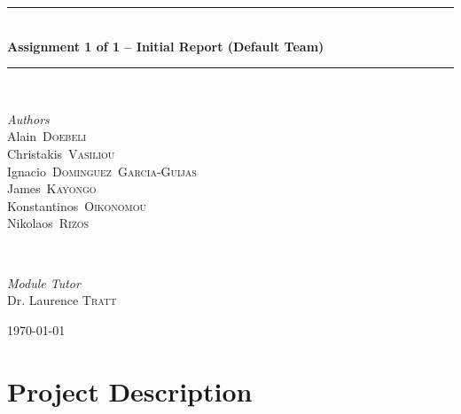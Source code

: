 \documentclass[11pt]{article}
\begin{document}
\begin{titlepage}
	\rule{\linewidth}{0.5mm} \\[4mm]
	{\Large \bfseries Assignment 1 of 1 -- Initial Report (Default Team)} \\
	\rule{\linewidth}{0.5mm} \\[8mm]
	\begin{minipage}[t]{0.5\textwidth}
		\begin{flushleft}
			\large
			\textit{Authors} \\
			\mbox{Alain \textsc{Doebeli}} \\ %
			\mbox{Christakis \textsc{Vasiliou}} \\ %
			\mbox{Ignacio \textsc{Dominguez Garcia-Guijas}} \\ %
			\mbox{James \textsc{Kayongo}} \\ %
			\mbox{Konstantinos \textsc{Oikonomou}} \\ %
			\mbox{Nikolaos \textsc{Rizos}} \\ %
		\end{flushleft}
	\end{minipage}
	~
	\begin{minipage}[t]{0.4\textwidth}
		\begin{flushright}
			\large
			\textit{Module Tutor} \\
			Dr. Laurence \textsc{Tratt}
		\end{flushright}
	\end{minipage}
	
	\vspace*{\fill}
	\hspace{0pt}

	{\large{\today}} %
	
	\vspace*{\fill}
	\hspace{0pt}
	
\end{titlepage}


\section{Project Description}
\end{document}
